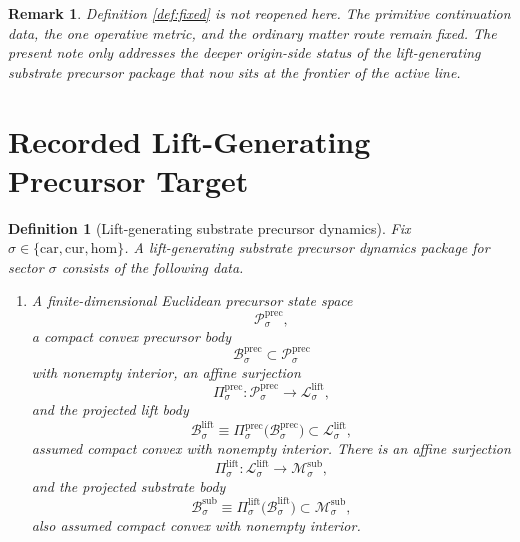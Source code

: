 \documentclass[11pt]{article}
\newcommand{\Car}{\mathrm{car}}
\newcommand{\Cur}{\mathrm{cur}}
\newcommand{\Hom}{\mathrm{hom}}
\newcommand{\SubSpace}[1]{\mathcal M_{#1}^{\mathrm{sub}}}
\newcommand{\SubBody}[1]{\mathcal B_{#1}^{\mathrm{sub}}}
\newcommand{\LiftSpace}[1]{\mathcal L_{#1}^{\mathrm{lift}}}
\newcommand{\LiftBody}[1]{\mathcal B_{#1}^{\mathrm{lift}}}
\newcommand{\LiftProj}[1]{\Pi_{#1}^{\mathrm{lift}}}
\newcommand{\PrecSpace}[1]{\mathcal P_{#1}^{\mathrm{prec}}}
\newcommand{\PrecBody}[1]{\mathcal B_{#1}^{\mathrm{prec}}}
\newcommand{\PrecProj}[1]{\Pi_{#1}^{\mathrm{prec}}}
\newtheorem{definition}{Definition}
\newtheorem{remark}{Remark}
\begin{document}
\begin{remark}
Definition \ref{def:fixed} is not reopened here. The primitive continuation data, the one operative metric, and the ordinary matter route remain fixed. The present note only addresses the deeper origin-side status of the lift-generating substrate precursor package that now sits at the frontier of the active line.
\end{remark}

\section{Recorded Lift-Generating Precursor Target}

\begin{definition}[Lift-generating substrate precursor dynamics]
\label{def:prec}
Fix \(\sigma\in\{\Car,\Cur,\Hom\}\). A \emph{lift-generating substrate precursor dynamics package} for sector \(\sigma\) consists of the following data.
\begin{enumerate}
    \item A finite-dimensional Euclidean precursor state space
    \[
    \PrecSpace{\sigma},
    \]
    a compact convex precursor body
    \[
    \PrecBody{\sigma}\subset\PrecSpace{\sigma}
    \]
    with nonempty interior, an affine surjection
    \[
    \PrecProj{\sigma}:\PrecSpace{\sigma}\to\LiftSpace{\sigma},
    \]
    and the projected lift body
    \[
    \LiftBody{\sigma}
    \equiv
    \PrecProj{\sigma}\bigl(\PrecBody{\sigma}\bigr)
    \subset\LiftSpace{\sigma},
    \]
    assumed compact convex with nonempty interior. There is an affine surjection
    \[
    \LiftProj{\sigma}:\LiftSpace{\sigma}\to\SubSpace{\sigma},
    \]
    and the projected substrate body
    \[
    \SubBody{\sigma}
    \equiv
    \LiftProj{\sigma}\bigl(\LiftBody{\sigma}\bigr)
    \subset\SubSpace{\sigma},
    \]
    also assumed compact convex with nonempty interior.


\end{enumerate}
\end{definition}
\end{document}
